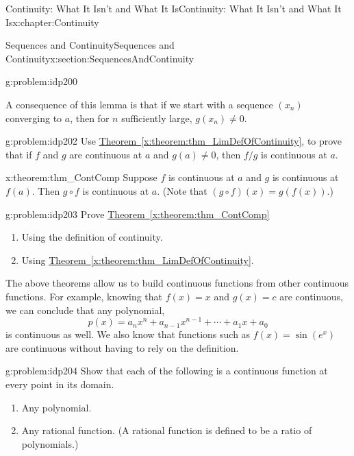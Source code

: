 \begin{chapterptx}{Continuity: What It Isn't and What It Is}{}{Continuity: What It Isn't and What It Is}{}{}{x:chapter:Continuity}
\begin{sectionptx}{Sequences and Continuity}{}{Sequences and Continuity}{}{}{x:section:SequencesAndContinuity}
\begin{problem}{}{g:problem:idp200}
		\end{problem}
		A consequence of this lemma is that if we start with a sequence \(\left(x_n\right)\) converging to \(a\), then for \(n\) sufficiently large, \(g(x_n)\neq 0\).%
		\begin{problem}{}{g:problem:idp202}%
			Use \hyperref[x:theorem:thm_LimDefOfContinuity]{Theorem~{\xreffont\ref{x:theorem:thm_LimDefOfContinuity}}}, to prove that if \(f\) and \(g\) are continuous at \(a\) and \(g(a)\neq 0\), then \(f/g\) is continuous at \(a\).%
		\end{problem}
		\begin{theorem}{}{}{x:theorem:thm_ContComp}%
			Suppose \(f\) is continuous at \(a\) and \(g\) is continuous at \(f(a)\).  Then \(g\circ f\) is continuous at \(a.\) (Note that \((g\circ f)(x)=g(f(x))\).)%
		\end{theorem}
		\begin{problem}{}{g:problem:idp203}%
			Prove \hyperref[x:theorem:thm_ContComp]{Theorem~{\xreffont\ref{x:theorem:thm_ContComp}}}%
			\begin{enumerate}[font=\bfseries,label=(\alph*),ref=\alph*]
				\item{}Using the definition of continuity.%
				\item{}Using \hyperref[x:theorem:thm_LimDefOfContinuity]{Theorem~{\xreffont\ref{x:theorem:thm_LimDefOfContinuity}}}.%
			\end{enumerate}
		\end{problem}
		The above theorems allow us to build continuous functions from other continuous functions.  For example, knowing that \(f(x)=x\) and \(g(x)=c\) are continuous, we can conclude that any polynomial,%
		\begin{equation*}
			p(x)=a_nx^n+a_{n-1}x^{n-1}+\cdots+a_1x+a_0
		\end{equation*}
		is continuous as well. We also know that functions such as \(f(x)=\sin\left(e^x\right)\) are continuous without having to rely on the definition.%
		\begin{problem}{}{g:problem:idp204}%
			Show that each of the following is a continuous function at every point in its domain.%
			\begin{enumerate}[font=\bfseries,label=(\alph*),ref=\alph*]
				\item{}Any polynomial.%
				\item{}Any rational function. (A rational function is defined to be a ratio of polynomials.)%

\end{enumerate}
\end{problem}
\end{sectionptx}
\end{chapterptx}
